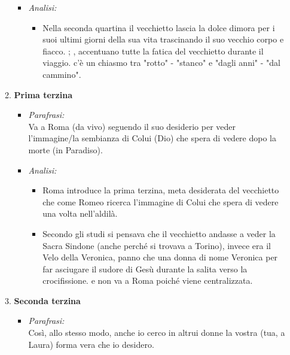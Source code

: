 \documentclass{article}
\begin{document}
\begin{enumerate}
\begin{enumerate}[label=]
\begin{itemize}[label=]
                    \item \textit{Analisi:}
                        \begin{itemize}
                            \item Nella seconda quartina il vecchietto lascia la dolce dimora per i suoi ultimi giorni della sua vita trascinando il suo vecchio corpo e fiacco.
                            ; ,  accentuano tutte la fatica del vecchietto durante il viaggio.
                             c’è un chiasmo tra "rotto" - "stanco" e "dagli anni" - "dal cammino".
                        \end{itemize}
                \end{itemize}
            \item \textbf{Prima terzina}
                \begin{itemize}[label=]
                    \item \textit{Parafrasi:}\\
                        Va a Roma (da vivo) seguendo il suo desiderio per veder l'immagine/la sembianza di Colui (Dio) che spera di vedere dopo la morte (in Paradiso).
                    \item \textit{Analisi:}
                        \begin{itemize}
                            \item Roma introduce la prima terzina, meta desiderata del vecchietto che come Romeo ricerca l'immagine di Colui che spera di vedere una volta nell'aldilà.
                            \item Secondo gli studi si pensava che il vecchietto andasse a veder la Sacra Sindone (anche perché si trovava a Torino), invece era il Velo della Veronica, panno che una donna di nome Veronica per far asciugare il sudore di Gesù durante la salita verso la crocifissione.
                             e non va a Roma poiché viene centralizzata.
                        \end{itemize}
                \end{itemize}
            \item \textbf{Seconda terzina}
                \begin{itemize}[label=]
                    \item \textit{Parafrasi:}\\
                        Così, allo stesso modo, anche io cerco in altrui donne la vostra (tua, a Laura) forma vera che io desidero.

\end{itemize}
\end{enumerate}
\end{enumerate}
\end{document}
